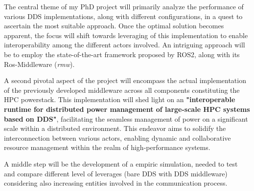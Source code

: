 The central theme of my PhD project will primarily analyze the performance of various DDS implementations, along with different configurations, in a quest to ascertain the most suitable approach. Once the optimal solution becomes apparent, the focus will shift towards leveraging of this implementation to enable interoperability among the different actors involved. An intriguing approach will be to employ the state-of-the-art framework proposed by ROS2, along with its Ros-Middleware (\emph{rmw}).

A second pivotal aspect of the project will encompass the actual implementation of the previously developed middleware across all components constituting the HPC powerstack. This implementation will shed light on an \textbf{"interoperable runtime for distributed power management of large-scale HPC systems based on DDS"}, facilitating the seamless management of power on a significant scale within a distributed environment. This endeavor aims to solidify the interconnection between various actors, enabling dynamic and collaborative resource management within the realm of high-performance systems.

A middle step will be the development of a empiric simulation, needed to test and compare different level of leverages (bare DDS with DDS middleware) considering also increasing entities involved in the communication process.


